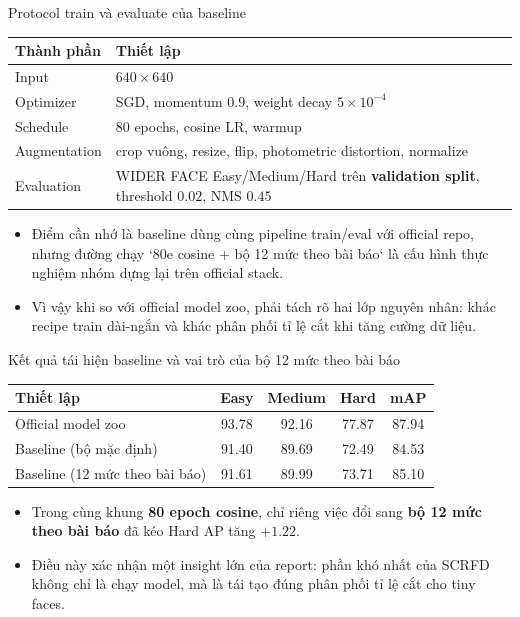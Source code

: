 \documentclass[aspectratio=169,11pt]{beamer}
\begin{document}
\begin{frame}{Protocol train và evaluate của baseline}
  \small
  \begin{tabular}{@{}p{}p{}@{}}
    \toprule
    Thành phần & Thiết lập \\
    \midrule
    Input & \(640 \times 640\) \\
    Optimizer & SGD, momentum \(0.9\), weight decay \(5\times10^{-4}\) \\
    Schedule & 80 epochs, cosine LR, warmup \\
    Augmentation & crop vuông, resize, flip, photometric distortion, normalize \\
    Evaluation & WIDER FACE Easy/Medium/Hard trên \textbf{validation split}, threshold \(0.02\), NMS \(0.45\) \\
    \bottomrule
  \end{tabular}

  \vspace{0.3cm}
  \begin{itemize}
    \item Điểm cần nhớ là baseline dùng cùng pipeline train/eval với official repo, nhưng đường chạy `80e cosine + bộ 12 mức theo bài báo` là cấu hình thực nghiệm nhóm dựng lại trên official stack.
    \item Vì vậy khi so với official model zoo, phải tách rõ hai lớp nguyên nhân: khác recipe train dài-ngắn và khác phân phối tỉ lệ cắt khi tăng cường dữ liệu.
  \end{itemize}
\end{frame}

\begin{frame}{Kết quả tái hiện baseline và vai trò của bộ 12 mức theo bài báo}
  \small
  \begin{tabular}{@{}lcccc@{}}
    \toprule
    Thiết lập & Easy & Medium & Hard & mAP \\
    \midrule
    Official model zoo & 93.78 & 92.16 & 77.87 & 87.94 \\
    Baseline (bộ mặc định) & 91.40 & 89.69 & 72.49 & 84.53 \\
    Baseline (12 mức theo bài báo) & 91.61 & 89.99 & 73.71 & 85.10 \\
    \bottomrule
  \end{tabular}

  \vspace{0.35cm}
  \begin{itemize}
    \item Trong cùng khung \textbf{80 epoch cosine}, chỉ riêng việc đổi sang \textbf{bộ 12 mức theo bài báo} đã kéo Hard AP tăng \(+1.22\).
    \item Điều này xác nhận một insight lớn của report: phần khó nhất của SCRFD không chỉ là chạy model, mà là tái tạo đúng phân phối tỉ lệ cắt cho tiny faces.
  \end{itemize}
\end{frame}
\end{document}
